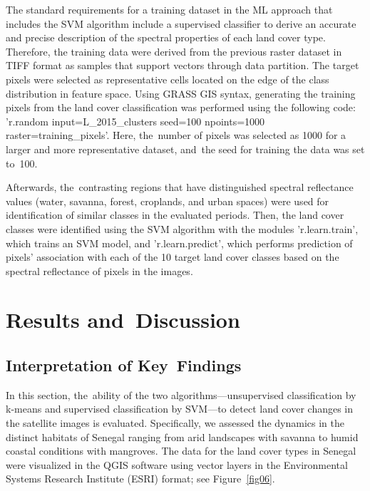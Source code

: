 \documentclass[earth,article,accept,pdftex,moreauthors]{Definitions/mdpi}
\begin{document}
{{The standard requirements for a training dataset in {the} ML {approach that includes the SVM algorithm} include a supervised classifier to derive an accurate and precise description of the spectral properties of each land cover type. Therefore,{ }the training data were derived from the previous raster dataset in TIFF format {as samples that support vectors through data partition.} {The} target pixels were selected as representative cells located on the edge of the class distribution in feature space. Using GRASS GIS syntax, generating the training pixels from the land cover classification was performed using the following code{:} 'r.random input=L\_2015\_clusters seed=100 npoints=1000 raster=training\_pixels'. Here, the~number of pixels was selected as 1000 for a larger and more representative dataset, and~the seed for training the data was set to~100. 

{Afterwards}, the~contrasting regions that {have} distinguished{ }spectral reflectance values {(}water, savanna, forest, croplands, and urban spaces{)} were used for identification of  similar classes in the evaluated periods{. Then,} the land cover classes were identified using the SVM algorithm{ }with the modules 'r.learn.train', which trains an SVM model, and 'r.learn.predict', which performs prediction of pixels' association with each of the 10 target land cover classes based on the spectral reflectance of pixels in the images.}

\section{Results and~Discussion}
\unskip

\subsection{{Interpretation of Key~Findings}}

{In this section, the~ability of the two algorithms---unsupervised classification by k-means and supervised classification by SVM---to detect land cover changes in the satellite images is evaluated. Specifically, we assessed {the }dynamics in {the }distinct habitats of Senegal ranging from arid landscapes with savanna to humid coastal conditions with mangroves. }The data for the land cover types in Senegal{ were} visualized in the QGIS software using {vector layers in }the Environmental Systems Research Institute (ESRI) format; see Figure~\ref{fig06}. 

}
\end{document}
